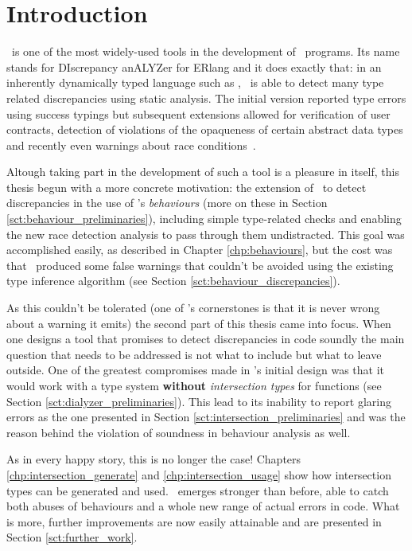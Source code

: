 \chapter{Introduction}

\dr\ is one of the most widely-used tools in the development of
\er\ programs. Its name stands for DIscrepancy anALYZer for ERlang and
it does exactly that: in an inherently dynamically typed language such
as \er, \dr\ is able to detect many type related discrepancies using
static analysis. The initial version reported type errors using
success typings but subsequent extensions allowed for verification of
user contracts, detection of violations of the opaqueness of certain
abstract data types and recently even warnings about race
conditions~\cite{Races@PADL-10,
  springerlink:10.1007/978-3-540-30477-7_7, SuccessTypings@PPDP-06,
  opaques}.

Altough taking part in the development of such a tool is a pleasure in
itself, this thesis begun with a more concrete motivation: the
extension of \dr\ to detect discrepancies in the use of \er's
\emph{behaviours} (more on these in Section
\ref{sct:behaviour_preliminaries}), including simple type-related
checks and enabling the new race detection analysis to pass through
them undistracted. This goal was accomplished easily, as described in
Chapter \ref{chp:behaviours}, but the cost was that \dr\ produced some
false warnings that couldn't be avoided using the existing type
inference algorithm (see Section \ref{sct:behaviour_discrepancies}).

As this couldn't be tolerated (one of \dr's cornerstones is that it is
never wrong about a warning it emits) the second part of this thesis
came into focus. When one designs a tool that promises to detect
discrepancies in code soundly the main question that needs to be
addressed is not what to include but what to leave outside. One of the
greatest compromises made in \dr's initial design was that it would
work with a type system \textbf{without} \emph{intersection types} for
functions (see Section \ref{sct:dialyzer_preliminaries}). This lead to
its inability to report glaring errors as the one presented in Section
\ref{sct:intersection_preliminaries} and was the reason behind the
violation of soundness in behaviour analysis as well.

As in every happy story, this is no longer the case! Chapters
\ref{chp:intersection_generate} and \ref{chp:intersection_usage} show
how intersection types can be generated and used. \dr\ emerges
stronger than before, able to catch both abuses of behaviours and a
whole new range of actual errors in code. What is more, further
improvements are now easily attainable and are presented in Section
\ref{sct:further_work}.
